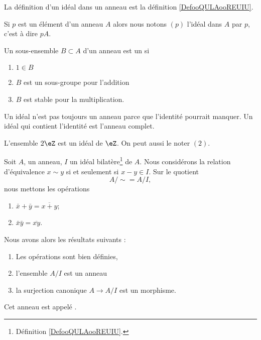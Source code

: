 La définition d'un idéal dans un anneau est la définition \ref{DefooQULAooREUIU}.


\begin{definition}  \label{DefSKTooOTauAR}
    Si \( p\) est un élément d'un anneau \( A\) alors nous notons \( (p)\) l'idéal dans \( A\)  par \( p\), c'est à dire \( pA\).
\end{definition}

\begin{definition}  \label{DefAJVTPxb}
    Un sous-ensemble \( B\subset A\) d'un anneau est un  si
    \begin{enumerate}
        \item
            \( 1\in B\)
        \item
            \( B\) est un sous-groupe pour l'addition
        \item
            \( B\) est stable pour la multiplication.
    \end{enumerate}
\end{definition}

\begin{remark}
    Un idéal n'est pas toujours un anneau parce que l'identité pourrait manquer. Un idéal qui contient l'identité est l'anneau complet.
\end{remark}

\begin{example}
    L'ensemble \( 2\eZ\) est un idéal de \( \eZ\). On peut aussi le noter \( (2) \).
\end{example}

\begin{propositionDef}      \label{PROPooGXMRooTcUGbi}
    Soit \( A\), un anneau, \( I\) un idéal bilatère\footnote{Définition \ref{DefooQULAooREUIU}.} de \( A\). Nous considérons la relation d'équivalence \( x\sim y\) si et seulement si \( x-y\in I\). Sur le quotient
    \begin{equation}
        A/\sim=A/I,
    \end{equation}
    nous mettons les opérations
    \begin{enumerate}
        \item
            \( \bar x+\bar y=\overline{ x+y }\);
        \item
            \( \bar x\bar y=\overline{ xy }\).
    \end{enumerate}
    Nous avons alors les résultats suivants :
    \begin{enumerate}
        \item
            Les opérations sont bien définies,
        \item
            l'ensemble \( A/I\) est un anneau
        \item
            la surjection canonique \( A\to A/I\) est un morphisme.
    \end{enumerate}
    Cet anneau est appelé .
\end{propositionDef}

